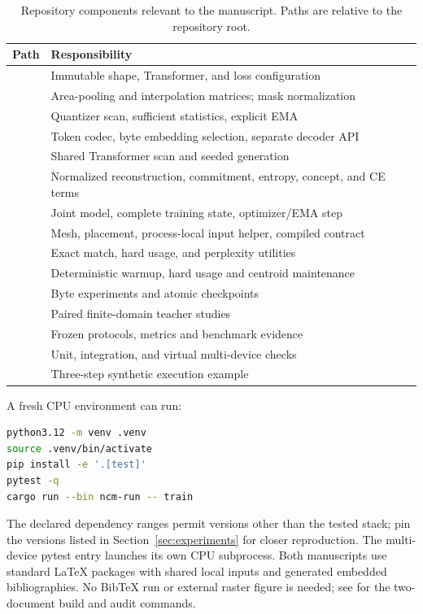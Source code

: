 \documentclass[11pt,a4paper]{article}
\begin{document}
\begin{table}[h]
\centering\small
\caption{Repository components relevant to the manuscript. Paths are relative
to the repository root.}
\begin{tabularx}{\linewidth}{@{}lY@{}}
\toprule
Path & Responsibility\\
\midrule
{} & Immutable shape, Transformer, and loss configuration\\
 & Area-pooling and interpolation matrices; mask normalization\\
 & Quantizer scan, sufficient statistics, explicit EMA\\
 & Token codec, byte embedding selection, separate decoder API\\
 & Shared Transformer scan and seeded generation\\
 & Normalized reconstruction, commitment, entropy, concept, and CE terms\\
 & Joint model, complete training state, optimizer/EMA step\\
 & Mesh, placement, process-local input helper, compiled contract\\
 & Exact match, hard usage, and perplexity utilities\\
 & Deterministic warmup, hard usage and centroid maintenance\\
 & Byte experiments and atomic checkpoints\\
 & Paired finite-domain teacher studies\\
 & Frozen protocols, metrics and benchmark evidence\\
 & Unit, integration, and virtual multi-device checks\\
 & Three-step synthetic execution example\\
\bottomrule
\end{tabularx}
\end{table}

A fresh CPU environment can run:
\begin{lstlisting}[language=bash]
python3.12 -m venv .venv
source .venv/bin/activate
pip install -e '.[test]'
pytest -q
cargo run --bin ncm-run -- train
\end{lstlisting}
The declared dependency ranges permit versions other than the tested stack;
pin the versions listed in Section~\ref{sec:experiments} for closer
reproduction. The multi-device pytest entry launches its own CPU subprocess.
Both manuscripts use standard LaTeX packages with shared local inputs and
generated embedded bibliographies. No BibTeX run or external raster figure is
needed; see  for the two-document build and audit commands.
\end{document}

